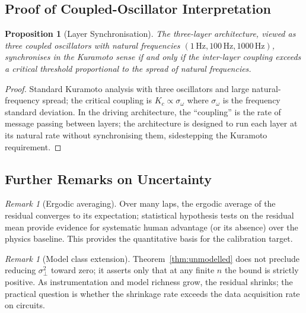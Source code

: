 \documentclass[11pt,twocolumn]{article}
\newtheorem{proposition}[theorem]{Proposition}
\theoremstyle{definition}
\theoremstyle{remark}
\newtheorem{remark}[theorem]{Remark}
\begin{document}
\subsection{Proof of Coupled-Oscillator Interpretation}

\begin{proposition}[Layer Synchronisation]\label{prop:osc}
The three-layer architecture, viewed as three coupled oscillators with natural frequencies $(1\,\mathrm{Hz}, 100\,\mathrm{Hz}, 1000\,\mathrm{Hz})$, synchronises in the Kuramoto sense \cite{kuramoto1984chemical,strogatz2000kuramoto,pikovsky2001synchronization,acebron2005kuramoto} if and only if the inter-layer coupling exceeds a critical threshold proportional to the spread of natural frequencies.
\end{proposition}

\begin{proof}
Standard Kuramoto analysis with three oscillators and large natural-frequency spread; the critical coupling is $K_c \propto \sigma_\omega$ where $\sigma_\omega$ is the frequency standard deviation. In the driving architecture, the ``coupling'' is the rate of message passing between layers; the architecture is designed to run each layer at its natural rate without synchronising them, sidestepping the Kuramoto requirement.
\end{proof}

\subsection{Further Remarks on Uncertainty}

\begin{remark}[Ergodic averaging]\label{rem:ergodic}
Over many laps, the ergodic average of the residual converges to its expectation; statistical hypothesis tests on the residual mean provide evidence for systematic human advantage (or its absence) over the physics baseline. This provides the quantitative basis for the calibration target.
\end{remark}

\begin{remark}[Model class extension]\label{rem:extension}
Theorem~\ref{thm:unmodelled} does not preclude reducing $\sigma^2_{\perp}$ toward zero; it asserts only that at any finite $n$ the bound is strictly positive. As instrumentation and model richness grow, the residual shrinks; the practical question is whether the shrinkage rate exceeds the data acquisition rate on circuits.
\end{remark}
\end{document}
